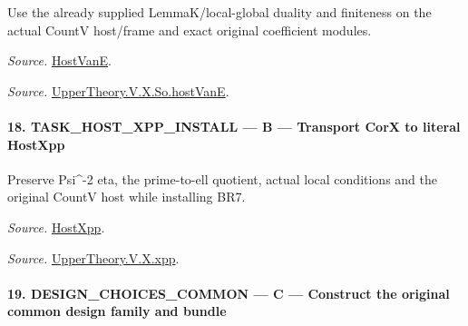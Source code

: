 \documentclass[11pt,a4paper]{article}
\numberwithin{equation}{section}
\theoremstyle{remark}\newtheorem{remark}[theorem]{Remark}
\begin{document}
Use the already supplied LemmaK/local-global duality and finiteness on the actual CountV host/frame and exact original coefficient modules.

\emph{Source.} \href{https://github.com/CocoSgt/riemann-hypothesis-lean/blob/7cbf7a0c32fca1badf05931879a37c3f8a2b03b4/src/Development/AutomorphicArithmetic/AutomorphicVarieties/UnitaryThreeDeformations/HostNumber.lean#L9-L12}{HostVanE}.

\emph{Source.} \href{https://github.com/CocoSgt/riemann-hypothesis-lean/blob/7cbf7a0c32fca1badf05931879a37c3f8a2b03b4/src/Development/AutomorphicArithmetic/AutomorphicVarieties/LevelCohomology/SoHostVanE.lean#L11-L18}{UpperTheory.V.X.So.hostVanE}.



\paragraph{18. TASK\_\allowbreak HOST\_\allowbreak XPP\_\allowbreak INSTALL — B — Transport CorX to literal HostXpp}

Preserve Psi\textasciicircum{}-2 eta, the prime-to-ell quotient, actual local conditions and the original CountV host while installing BR7.

\emph{Source.} \href{https://github.com/CocoSgt/riemann-hypothesis-lean/blob/7cbf7a0c32fca1badf05931879a37c3f8a2b03b4/src/Development/AutomorphicArithmetic/AutomorphicVarieties/UnitaryThreeDeformations/HostNumber.lean#L14-L17}{HostXpp}.

\emph{Source.} \href{https://github.com/CocoSgt/riemann-hypothesis-lean/blob/7cbf7a0c32fca1badf05931879a37c3f8a2b03b4/src/Development/AutomorphicArithmetic/AutomorphicVarieties/LevelCohomology/Xpp.lean#L11-L84}{UpperTheory.V.X.xpp}.



\paragraph{19. DESIGN\_\allowbreak CHOICES\_\allowbreak COMMON — C — Construct the original common design family and bundle}
\end{document}
